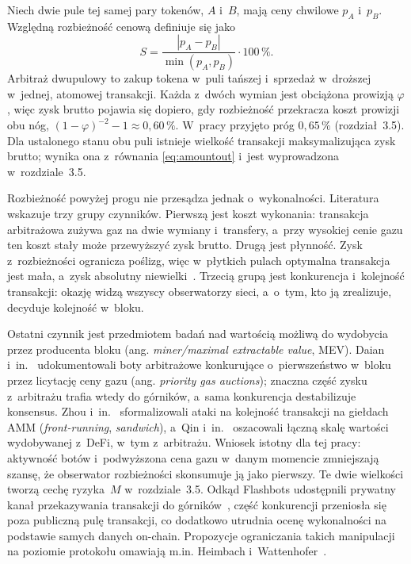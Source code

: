 Niech dwie pule tej samej pary tokenów, $A$ i~$B$, mają ceny chwilowe $p_A$ i~$p_B$. Względną
rozbieżność cenową definiuje się jako
\begin{equation}
  S = \frac{|p_A - p_B|}{\min(p_A, p_B)} \cdot 100\,\%.
  \label{eq:spread}
\end{equation}
Arbitraż dwupulowy to zakup tokena w~puli tańszej i~sprzedaż w~droższej w~jednej, atomowej
transakcji. Każda z~dwóch wymian jest obciążona prowizją $\varphi$, więc zysk brutto pojawia się
dopiero, gdy rozbieżność przekracza koszt prowizji obu nóg, $(1-\varphi)^{-2} - 1 \approx
0{,}60\,\%$. W~pracy przyjęto próg $0{,}65\,\%$ (rozdział~3.5). Dla ustalonego stanu obu puli
istnieje wielkość transakcji maksymalizująca zysk brutto; wynika ona z~równania
\eqref{eq:amountout} i~jest wyprowadzona w~rozdziale~3.5.

Rozbieżność powyżej progu nie przesądza jednak o~wykonalności. Literatura wskazuje trzy grupy
czynników. Pierwszą jest koszt wykonania: transakcja arbitrażowa zużywa gaz na dwie wymiany
i~transfery, a~przy wysokiej cenie gazu ten koszt stały może przewyższyć zysk brutto. Drugą jest
płynność. Zysk z~rozbieżności ogranicza poślizg, więc w~płytkich pulach optymalna transakcja
jest mała, a~zysk absolutny niewielki~\cite{angeris_uniswap}. Trzecią grupą jest konkurencja
i~kolejność transakcji: okazję widzą wszyscy obserwatorzy sieci, a~o~tym, kto ją zrealizuje,
decyduje kolejność w~bloku.

Ostatni czynnik jest przedmiotem badań nad wartością możliwą do wydobycia przez producenta
bloku (ang. \emph{miner/maximal extractable value}, MEV). Daian i~in.~\cite{daian_flashboys}
udokumentowali boty arbitrażowe konkurujące o~pierwszeństwo w~bloku przez licytację ceny gazu
(ang. \emph{priority gas auctions}); znaczna część zysku z~arbitrażu trafia wtedy do górników,
a~sama konkurencja destabilizuje konsensus. Zhou i~in.~\cite{zhou_hft_dex} sformalizowali ataki na
kolejność transakcji na giełdach AMM (\emph{front-running}, \emph{sandwich}), a~Qin
i~in.~\cite{qin_bev} oszacowali łączną skalę wartości wydobywanej z~DeFi, w~tym z~arbitrażu.
Wniosek istotny dla tej pracy: aktywność botów i~podwyższona cena gazu w~danym momencie
zmniejszają szansę, że obserwator rozbieżności skonsumuje ją jako pierwszy. Te dwie wielkości
tworzą cechę ryzyka~$M$ w~rozdziale~3.5. Odkąd Flashbots udostępnili prywatny kanał przekazywania
transakcji do górników~\cite{flashbots}, część konkurencji przeniosła się poza publiczną pulę
transakcji, co dodatkowo utrudnia ocenę wykonalności na podstawie samych danych on-chain.
Propozycje ograniczania takich manipulacji na poziomie protokołu omawiają m.in. Heimbach
i~Wattenhofer~\cite{heimbach_sandwich}.

